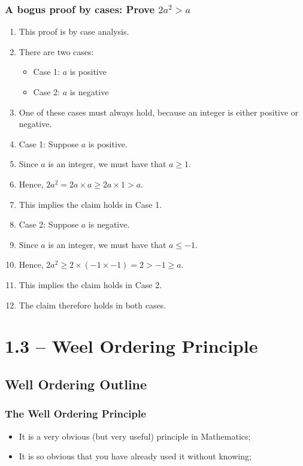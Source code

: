 \documentclass{beamer}
\begin{document}
\begin{frame}
  \frametitle{A bogus proof by cases: Prove $2a^2 > a$}
  \begin{enumerate}
  \item This proof is by case analysis.
  \item There are two cases:
    \begin{itemize}
      \item Case 1: $a$ is positive
      \item Case 2: $a$ is negative
    \end{itemize}
  \item One of these cases must always hold, because an integer is either positive or negative.
  \item Case 1: Suppose $a$ is positive.
  \item Since $a$ is an integer, we must have that $a \geq 1$.
  \item Hence, $2a^2 = 2a\times a \geq 2a\times 1 > a$.
  \item This implies the claim holds in Case 1.
  \item Case 2: Suppose $a$ is negative.
  \item Since $a$ is an integer, we must have that $a \leq -1$.
  \item Hence, $2a^2 \geq 2\times (-1 \times -1) = 2 > -1 \geq a$.
  \item This implies the claim holds in Case 2.
  \item The claim therefore holds in both cases.
  \end{enumerate}
\end{frame}

\section{1.3 -- Weel Ordering Principle}
\subsection{Well Ordering Outline}

\begin{frame}
  \frametitle{The Well Ordering Principle}

  \begin{itemize}
  \item It is a very obvious (but very useful) principle in Mathematics;
    \bigskip

  \item It is so obvious that you have already used it without knowing;
  \end{itemize}

\end{frame}
\end{document}
